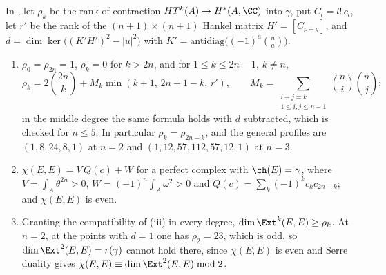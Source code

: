 \begin{proposition}
\label{prop:p2primeprofile}
In , let $\rho_{k}$ be the rank of contraction
$HT^{k}(A)\to H^{*}(A,\CC)$ into $\gamma$, put $C_{l}=l!\,c_{l}$, let
$r'$ be the rank of the $(n+1)\times(n+1)$ Hankel matrix $H'=[C_{p+q}]$, and
$d=\dim\ker\bigl((K'H')^{2}-|u|^{2}\bigr)$ with
$K'=\mathrm{antidiag}\bigl((-1)^{a}\binom{n}{a}\bigr)$.
\begin{enumerate}[label=\textup{(\roman*)},leftmargin=2.6em,itemsep=2pt]
\item $\rho_{0}=\rho_{2n}=1$, $\rho_{k}=0$ for $k>2n$, and for
  $1\le k\le2n-1$, $k\ne n$,
  \[
    \rho_{k}=2\binom{2n}{k}+M_{k}\min(k+1,\,2n+1-k,\,r'),\qquad
    M_{k}=\sum_{\substack{i+j=k\\1\le i,j\le n-1}}\binom{n}{i}\binom{n}{j};
  \]
  in the middle degree the same formula holds with $d$ subtracted, which is
  checked for $n\le5$. In particular $\rho_{k}=\rho_{2n-k}$, and the general
  profiles are $(1,8,24,8,1)$ at $n=2$ and $(1,12,57,112,57,12,1)$ at
  $n=3$.
\item $\chi(E,E)=V\,Q(c)+W$ for a perfect complex with $\ch(E)=\gamma$, where
  $V=\int_{A}\theta^{2n}>0$, $W=(-1)^{n}\int_{A}\omega^{2}>0$ and
  $Q(c)=\sum_{k}(-1)^{k}c_{k}c_{2n-k}$; and $\chi(E,E)$ is even.
\item Granting the compatibility of (iii) in every degree,
  $\dim\Ext^{k}(E,E)\ge\rho_{k}$. At $n=2$, at the points with $d=1$ one has
  $\rho_{2}=23$, which is odd, so $\dim\Ext^{2}(E,E)=r(\gamma)$ cannot hold
  there, since $\chi(E,E)$ is even and Serre duality gives
  $\chi(E,E)\equiv\dim\Ext^{2}(E,E)\bmod2$.
\end{enumerate}
\end{proposition}

